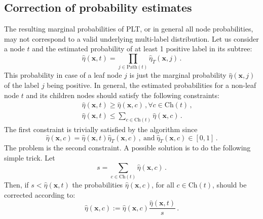 \documentclass{article}
\newcommand{\Algo}[1]{\textsc{#1}}
\renewcommand{\vec}[1]{\boldsymbol{#1}}
\newcommand{\bx}{\vec{x}}
\newcommand{\heta}{\hat{\eta}}
\newcommand{\pa}[1]{\mathrm{pa}(#1)}
\newcommand{\Path}[1]{\mathrm{Path}(#1)}
\newcommand{\Children}[1]{\mathrm{Ch}(#1)}
\newcommand{\sectionBefore}{-0pt}
\newcommand{\sectionAfter}{-0pt}
\begin{document}
{\vspace{\sectionBefore}
\subsection{Correction of probability estimates}
\label{sec:correction}
\vspace{\sectionAfter}

The resulting marginal probabilities of \Algo{PLT}, or in general all node probabilities, may not correspond to a valid underlying multi-label distribution. Let us consider a node $t$ and the estimated probability of at least 1 positive label in its subtree: 
$$
\heta(\bx, t) = \prod_{j \in \Path{t}} \heta_T(\bx, j) \,.
$$
This probability in case of a leaf node $j$ is just the marginal probability $\heta(\bx, j)$ of the label $j$ being positive.
In general, the estimated probabilities for a non-leaf node $t$ and its children nodes should satisfy the following constraints: 
\begin{eqnarray*}
&& \heta(\bx, t)  \ge \heta(\bx, c)\,, \forall c \in \Children{t}\,, \\
&& \heta(\bx, t)  \le \sum_{c \in \Children{t}}  \heta(\bx, c) \,. 
\end{eqnarray*}
The first constraint is trivially satisfied by the algorithm since 
$$
\heta(\bx, c) = \heta(\bx, t) \heta_T(\bx, c)\,,\mathrm{~and~}  \heta_T(\bx, c) \in [0,1]\,.
$$ 
The problem is the second constraint. A possible solution is to do the following simple trick. Let 
$$
s = \sum_{c \in \Children{t}} \heta(\bx, c) \,.
$$
Then, if $s < \heta(\bx, t)$ the probabilities $\heta(\bx, c)$, for all $c \in \Children{t}$, should be corrected according to:
$$
\heta(\bx, c) := \heta(\bx, c) \frac{\heta(\bx, t)}{s}\,.
$$


}
\end{document}
